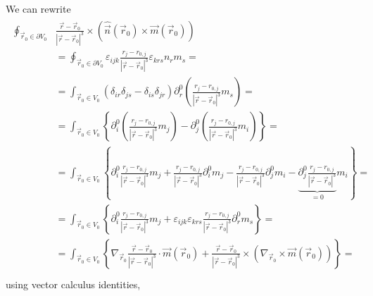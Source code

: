 \documentclass[letterpaper,10pt,english]{jupyterBook}
\begin{document}
\sphinxAtStartPar
We can rewrite
\begin{equation*}
\begin{split}\begin{aligned}
  \oint_{\vec{r}_0 \in \partial V_0} & \frac{\vec{r} - \vec{r}_0}{|\vec{r} - \vec{r}_0|^3} \times \left( \hat{\vec{n}}(\vec{r}_0) \times \vec{m}(\vec{r}_0) \right) \\
  & = \oint_{\vec{r}_0 \in \partial V_0} \varepsilon_{ijk} \frac{r_j - r_{0,j}}{|\vec{r}-\vec{r}_0|^3} \varepsilon_{krs} n_r m_s = \\
  & = \int_{\vec{r}_0 \in V_0} \left( \delta_{ir} \delta_{js} - \delta_{is} \delta_{jr} \right) \partial^0_r \left( \frac{r_j - r_{0,j}}{|\vec{r}-\vec{r}_0|^3} m_s \right) = \\
  & = \int_{\vec{r}_0 \in V_0} \left\{ \partial^0_i \left( \frac{r_j - r_{0,j}}{|\vec{r}-\vec{r}_0|^3} m_j \right) - \partial^0_j \left( \frac{r_j - r_{0,j}}{|\vec{r}-\vec{r}_0|^3} m_i \right)  \right\} = \\
  & = \int_{\vec{r}_0 \in V_0}
  \left\{ \partial^0_i \frac{r_j - r_{0,j}}{|\vec{r}-\vec{r}_0|^3} m_j
         + \frac{r_j - r_{0,j}}{|\vec{r}-\vec{r}_0|^3} \partial^0_i m_j
         - \frac{r_j - r_{0,j}}{|\vec{r}-\vec{r}_0|^3} \partial^0_j m_i
         - \underbrace{ \partial^0_j \frac{r_j - r_{0,j}}{|\vec{r}-\vec{r}_0|^3}}_{=0} m_i
  \right\} = \\
  & = \int_{\vec{r}_0 \in V_0}
  \left\{ \partial^0_i \frac{r_j - r_{0,j}}{|\vec{r}-\vec{r}_0|^3} m_j
         + \varepsilon_{ijk} \varepsilon_{krs} \frac{r_j - r_{0,j}}{|\vec{r}-\vec{r}_0|^3} \partial^0_r m_s
  \right\} = \\
  & = \int_{\vec{r}_0 \in V_0}
  \left\{ \nabla_{\vec{r}_0} \frac{\vec{r} - \vec{r}_0}{|\vec{r}-\vec{r}_0|^3} \cdot \vec{m}(\vec{r}_0)
         + \frac{\vec{r} - \vec{r}_0}{|\vec{r}-\vec{r}_0|^3} \times \left( \nabla_{\vec{r}_0} \times \vec{m}(\vec{r}_0) \right)
  \right\} = \\
\end{aligned}\end{split}
\end{equation*}
\sphinxAtStartPar
using vector calculus identities,
\end{document}
